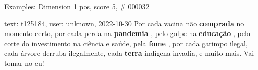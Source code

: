 \begin{frame}{Examples: Dimension 1 pos, score 5, \# 000032}
\footnotesize
\begin{exampleblock}{text: t125184, user: unknown, 2022-10-30}
Por cada vacina não \textbf{comprada} no momento certo, por cada perda na 
\textbf{pandemia} , pelo golpe na \textbf{educação} , pelo corte do 
investimento na ciência e saúde, pela \textbf{fome} , por cada garimpo ilegal, 
cada árvore derruba ilegalmente, cada \textbf{terra} indígena invadia, e muito 
mais. Vai tomar no cu! 
\end{exampleblock}
\end{frame}
